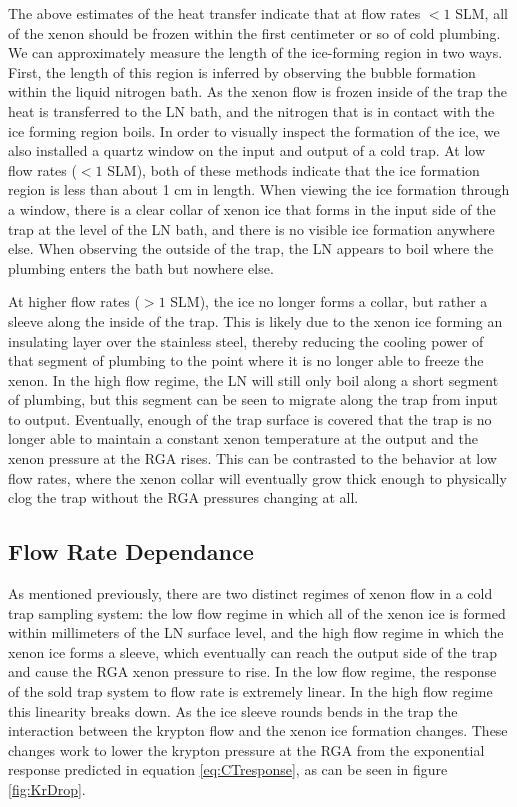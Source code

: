 \documentclass[12pt]{article}
\begin{document}
The above estimates of the heat transfer indicate that at flow rates $<1$ SLM, all of the xenon should be frozen within the first centimeter or so of cold plumbing. We can approximately measure the length of the ice-forming region in two ways. First, the length of this region is inferred by observing the bubble formation within the liquid nitrogen bath. As the xenon flow is frozen inside of the trap the heat is transferred to the LN bath, and the  nitrogen that is in contact with the ice forming region boils. In order to visually inspect the formation of the ice, we also installed a quartz window on the input and output of a cold trap. At low flow rates ($<1$ SLM), both of these methods indicate that the ice formation region is less than about 1 cm in length. When viewing the ice formation through a window, there is a clear collar of xenon ice that forms in the input side of the trap at the level of the LN bath, and there is no visible ice formation anywhere else. When observing the outside of the trap, the LN appears to boil where the plumbing enters the bath but nowhere else. 

At higher flow rates ($>1$ SLM), the ice no longer forms a collar, but rather a sleeve along the inside of the trap. This is likely due to the xenon ice forming an insulating layer over the stainless steel, thereby reducing the cooling power of that segment of plumbing to the point where it is no longer able to freeze the xenon. In the high flow regime, the LN will still only boil along a short segment of plumbing, but this segment can be seen to migrate along the trap from input to output. Eventually, enough of the trap surface is covered that the trap is no longer able to maintain a constant xenon temperature at the output and the xenon pressure at the RGA rises. This can be contrasted to the behavior at low flow rates, where the xenon collar will eventually grow thick enough to physically clog the trap without the RGA pressures changing at all.

\subsection{Flow Rate Dependance}
As mentioned previously, there are two distinct regimes of xenon flow in a cold trap sampling system: the low flow regime in which all of the xenon ice is formed within millimeters of the LN surface level, and the high flow regime in which the xenon ice forms a sleeve, which eventually can reach the output side of the trap and cause the RGA xenon pressure to rise. In the low flow regime, the response of the sold trap system to flow rate is extremely linear. In the high flow regime this linearity breaks down. As the ice sleeve rounds bends in the trap the interaction between the krypton flow and the xenon ice formation changes. These changes work to lower the krypton pressure at the RGA from the exponential response predicted in equation \ref{eq:CTresponse}, as can be seen in figure \ref{fig:KrDrop}.
\end{document}
